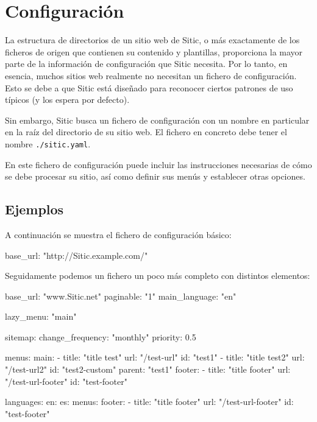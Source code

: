 \section{Configuración}

La estructura de directorios de un sitio web de Sitic, o más exactamente de los ficheros de origen
que contienen su contenido y plantillas, proporciona la mayor parte de la información de configuración
que Sitic necesita. Por lo tanto, en esencia, muchos sitios web realmente no necesitan un fichero de
configuración. Esto se debe a que Sitic está diseñado para reconocer ciertos patrones de uso típicos
(y los espera por defecto).

Sin embargo, Sitic busca un fichero de configuración con un nombre en particular en la raíz del directorio
de su sitio web. El fichero en concreto debe tener el nombre \texttt{./sitic.yaml}.

En este fichero de configuración puede incluir las instrucciones necesarias de cómo se
debe procesar su sitio, así como definir sus menús y establecer otras opciones.

\subsection{Ejemplos}

A continuación se muestra el fichero de configuración básico:

\begin{yamlcode}
base_url: "http://Sitic.example.com/"
\end{yamlcode}

Seguidamente podemos un fichero un poco más completo con distintos elementos:

\begin{yamlcode}
base_url: "www.Sitic.net"
paginable: "1"
main_language: "en"

lazy_menu: "main"

sitemap:
    change_frequency: "monthly"
    priority: 0.5

menus:
    main:
        - title: "title test"
          url: "/test-url"
          id: "test1"
        - title: "title test2"
          url: "/test-url2"
          id: "test2-custom"
          parent: "test1"
    footer:
        - title: "title footer"
          url: "/test-url-footer"
          id: "test-footer"


languages:
    en:
    es:
        menus:
            footer:
                - title: "title footer"
                  url: "/test-url-footer"
                  id: "test-footer"
\end{yamlcode}

